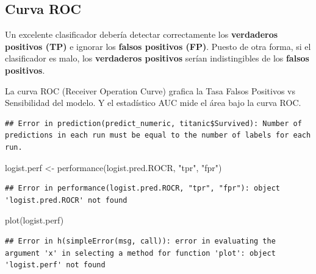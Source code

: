 \documentclass[
  12pt,
]{book}
\newenvironment{Shaded}{\begin{snugshade}}{\end{snugshade}}
\newcommand{\FunctionTok}[1]{\textcolor[rgb]{0.00,0.00,0.00}{#1}}
\newcommand{\NormalTok}[1]{#1}
\newcommand{\OtherTok}[1]{\textcolor[rgb]{0.56,0.35,0.01}{#1}}
\newcommand{\SpecialCharTok}[1]{\textcolor[rgb]{0.00,0.00,0.00}{#1}}
\newcommand{\StringTok}[1]{\textcolor[rgb]{0.31,0.60,0.02}{#1}}
\begin{document}
\hypertarget{curva-roc}{%
\subsection{Curva ROC}\label{curva-roc}}

Un excelente clasificador debería detectar correctamente los
\textbf{verdaderos positivos (TP)} e ignorar los \textbf{falsos
positivos (FP)}. Puesto de otra forma, si el clasificador es malo, los
\textbf{verdaderos positivos} serían indistingibles de los
\textbf{falsos positivos}.

La curva ROC (Receiver Operation Curve) grafica la Tasa Falsos Positivos
vs Sensibilidad del modelo. Y el estadístico AUC mide el área bajo la
curva ROC.

\begin{Shaded}
\end{Shaded}

\begin{verbatim}
## Error in prediction(predict_numeric, titanic$Survived): Number of predictions in each run must be equal to the number of labels for each run.
\end{verbatim}

\begin{Shaded}
\begin{Highlighting}[]
\NormalTok{logist.perf }\OtherTok{\textless{}{-}} \FunctionTok{performance}\NormalTok{(logist.pred.ROCR, }\StringTok{"tpr"}\NormalTok{,}
    \StringTok{"fpr"}\NormalTok{)}
\end{Highlighting}
\end{Shaded}

\begin{verbatim}
## Error in performance(logist.pred.ROCR, "tpr", "fpr"): object 'logist.pred.ROCR' not found
\end{verbatim}

\begin{Shaded}
\begin{Highlighting}[]
\FunctionTok{plot}\NormalTok{(logist.perf)}
\end{Highlighting}
\end{Shaded}

\begin{verbatim}
## Error in h(simpleError(msg, call)): error in evaluating the argument 'x' in selecting a method for function 'plot': object 'logist.perf' not found
\end{verbatim}
\end{document}
